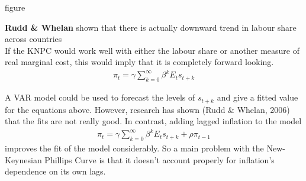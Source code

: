 \documentclass{beamer}
\begin{document}
\begin{frame}
  figure
\end{frame}

\begin{frame}
\textbf{Rudd \& Whelan} shown that there is actually downward trend in labour share across countries\\
 If the KNPC would work well with either the labour share or another measure of real marginal cost, this would imply that it is completely forward looking. 
\begin{align}
  \pi_t = \gamma \sum_{k=0}^{\infty} \beta^k E_t s_{t+k}
\end{align}
\end{frame}

\begin{frame}
A VAR model could be used to forecast the levels of $s_{t+k}$ and give a fitted value for the equations above.
However, research has shown (Rudd \& Whelan, 2006) that the fits are not really good. 
In contrast, adding lagged inflation to the model
\begin{align}
  \pi_t = \gamma \sum_{k=0}^{\infty} \beta^k E_t s_{t+k} + \rho \pi_{t-1}
\end{align}
improves the fit of the model considerably. 
So a main problem with the New-Keynesian Phillips Curve is that it doesn't account properly for inflation's dependence on its own lags. 

\end{frame}




\end{document}
